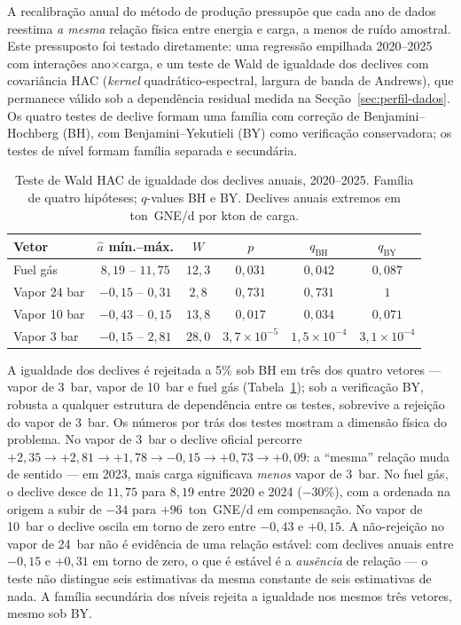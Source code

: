 A recalibração anual do método de produção pressupõe que cada ano de dados
reestima \emph{a mesma} relação física entre energia e carga, a menos de ruído
amostral. Este pressuposto foi testado diretamente: uma regressão
empilhada 2020--2025 com interações ano$\times$carga, e um teste de Wald de
igualdade dos declives com covariância HAC (\emph{kernel} quadrático-espectral,
largura de banda de Andrews), que permanece válido sob a dependência residual
medida na Secção~\ref{sec:perfil-dados}. Os quatro testes de declive formam uma
família com correção de Benjamini--Hochberg (BH), com
Benjamini--Yekutieli (BY) como verificação conservadora; os testes de nível
formam família separada e secundária.

\begin{table}[htbp]
  \centering
  \caption[Igualdade dos declives anuais]{Teste de Wald HAC de igualdade
  dos declives anuais, 2020--2025. Família de quatro hipóteses; $q$-values BH
  e BY. Declives anuais extremos em ton~GNE/d por kton de carga.}
  \label{tab:declives-anuais}
  \begin{tabular}{lccccc}
    \toprule
    Vetor & $\hat a$ mín.--máx. & $W$ & $p$ & $q_{\mathrm{BH}}$ & $q_{\mathrm{BY}}$ \\
    \midrule
    Fuel gás        & $8{,}19$ -- $11{,}75$   & $12{,}3$ & $0{,}031$            & $0{,}042$            & $0{,}087$ \\
    Vapor 24 bar    & $-0{,}15$ -- $0{,}31$   & $2{,}8$  & $0{,}731$            & $0{,}731$            & $1$ \\
    Vapor 10 bar    & $-0{,}43$ -- $0{,}15$   & $13{,}8$ & $0{,}017$            & $0{,}034$            & $0{,}071$ \\
    Vapor 3 bar     & $-0{,}15$ -- $2{,}81$   & $28{,}0$ & $3{,}7\times10^{-5}$ & $1{,}5\times10^{-4}$ & $3{,}1\times10^{-4}$ \\
    \bottomrule
  \end{tabular}
\end{table}

A igualdade dos declives é rejeitada a 5\% sob BH em três dos quatro vetores
--- vapor de 3~bar, vapor de 10~bar e fuel gás
(Tabela~\ref{tab:declives-anuais}); sob a verificação BY, robusta a qualquer
estrutura de dependência entre os testes, sobrevive a rejeição do vapor de
3~bar. Os números por trás dos testes mostram a dimensão física do problema.
No vapor de 3~bar o declive oficial percorre $+2{,}35 \to +2{,}81 \to +1{,}78
\to -0{,}15 \to +0{,}73 \to +0{,}09$: a ``mesma'' relação muda de sentido ---
em 2023, mais carga significava \emph{menos} vapor de 3~bar. No fuel gás, o
declive desce de $11{,}75$ para $8{,}19$ entre 2020 e 2024 (${-}30\%$), com a
ordenada na origem a subir de $-34$ para $+96$~ton~GNE/d em compensação. No
vapor de 10~bar o declive oscila em torno de zero entre $-0{,}43$ e $+0{,}15$.
A não-rejeição no vapor de 24~bar não é evidência de uma relação estável: com
declives anuais entre $-0{,}15$ e $+0{,}31$ em torno de zero, o que é estável
é a \emph{ausência} de relação --- o teste não distingue seis estimativas da
mesma constante de seis estimativas de nada. A família secundária dos níveis
rejeita a igualdade nos mesmos três vetores, mesmo sob BY.

